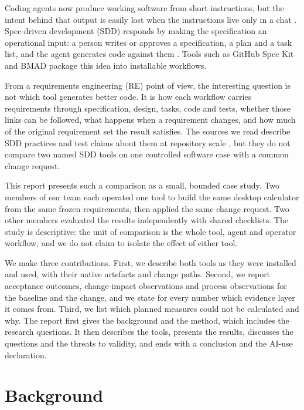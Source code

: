 \documentclass[conference]{IEEEtran}
\begin{document}
Coding agents now produce working software from short instructions, but
the intent behind that output is easily lost when the instructions live
only in a chat \cite{agarwal2026}. Spec-driven development (SDD)
responds by making the specification an operational input: a person
writes or approves a specification, a plan and a task list, and the
agent generates code against them \cite{piskala2026, claudino2026}.
Tools such as GitHub Spec Kit \cite{speckit} and BMAD \cite{bmad}
package this idea into installable workflows.

From a requirements engineering (RE) point of view, the interesting
question is not which tool generates better code. It is how each
workflow carries requirements through specification, design, tasks, code
and tests, whether those links can be followed, what happens when a
requirement changes, and how much of the original requirement set the
result satisfies. The sources we read describe SDD practices and test
claims about them at repository scale
\cite{claudino2026, agarwal2026, hill2026}, but they do not compare two
named SDD tools on one controlled software case with a common change
request.

This report presents such a comparison as a small, bounded case study.
Two members of our team each operated one tool to build the same desktop
calculator from the same frozen requirements, then applied the same
change request. Two other members evaluated the results independently
with shared checklists. The study is descriptive: the unit of comparison
is the whole tool, agent and operator workflow, and we do not claim to
isolate the effect of either tool.

We make three contributions. First, we describe both tools as they were
installed and used, with their native artefacts and change paths.
Second, we report acceptance outcomes, change-impact observations and
process observations for the baseline and the change, and we state for
every number which evidence layer it comes from. Third, we list which
planned measures could not be calculated and why. The report first gives
the background and the method, which includes the research questions. It
then describes the tools, presents the results, discusses the questions
and the threats to validity, and ends with a conclusion and the AI-use
declaration.

\section{Background}\label{background}
\end{document}
